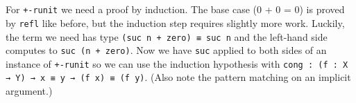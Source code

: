 \begin{code}%
\>[0]\AgdaSpace{}%
\AgdaSymbol{:}\AgdaSpace{}%
\AgdaSpace{}%
\AgdaSymbol{\{}\AgdaSymbol{\}}\AgdaSpace{}%
\AgdaSpace{}%
\AgdaSpace{}%
\AgdaOperator{\AgdaFunction{+}}\AgdaSpace{}%
\AgdaSpace{}%
\AgdaSpace{}%
\<%
\\
\>[0]\AgdaSpace{}%
\AgdaSymbol{\{}\AgdaSymbol{\}}\AgdaSpace{}%
\AgdaSymbol{=}\AgdaSpace{}%
\<%
\\
\>[0]\AgdaSpace{}%
\AgdaSymbol{\{}\AgdaSpace{}%
\AgdaSymbol{\}}\AgdaSpace{}%
\AgdaSymbol{=}\AgdaSpace{}%
\AgdaSpace{}%
\AgdaSpace{}%
\<%
\end{code}
For \texttt{+-runit} we need a proof by induction. The base case (0 + 0 = 0) is proved by \texttt{refl}
like before, but the induction step requires slightly more work.
Luckily, the term we need has type \texttt{(suc n + zero) ≡ suc n} and the left-hand side computes to \texttt{suc (n + zero)}.
Now we have \texttt{suc} applied to both sides of an instance of \texttt{+-runit} so we can use the induction hypothesis with \texttt{cong : (f : X → Y) → x ≡ y → (f x) ≡ (f y)}.
(Also note the pattern matching on an implicit argument.)

